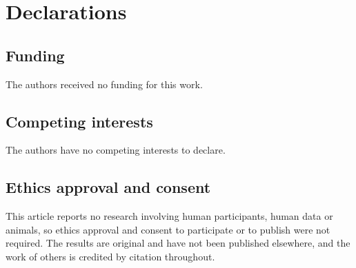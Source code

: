 \newcommand{\zenodoCodeID}{10.5281/zenodo.23225483}
\newcommand{\zenodoCodeDOI}{%
  \href{https://doi.org/\zenodoCodeID}{\texttt{\zenodoCodeID}}}

\section*{Declarations}

\subsection*{Funding}
The authors received no funding for this work.

\subsection*{Competing interests}
The authors have no competing interests to declare.

\subsection*{Ethics approval and consent}
This article reports no research involving human participants, human data or
animals, so ethics approval and consent to participate or to publish were not
required. The results are original and have not been published elsewhere,
and the work of others is credited by citation throughout.

